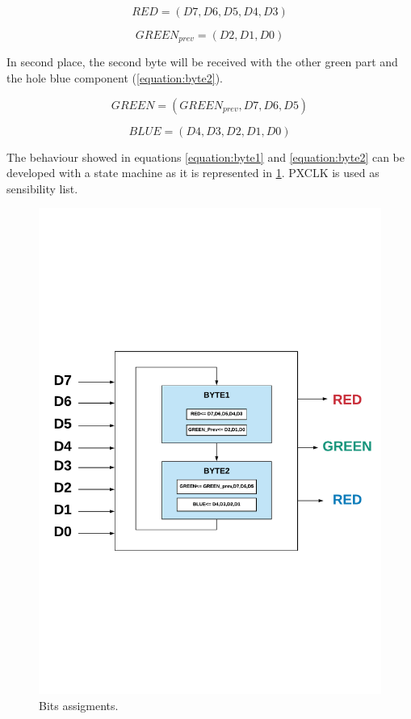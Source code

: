 	\begin{equation} \label{equation:byte1}
		RED = (D7,D6,D5,D4,D3)
	\end{equation}
	
	\begin{equation*}
		GREEN_{prev} = (D2,D1,D0)
	\end{equation*}
	
	In second place, the second byte will be received with the other green part and the hole blue component (\ref{equation:byte2}).
	
	\begin{equation} \label{equation:byte2}
	GREEN = (GREEN_{prev},D7,D6,D5)
	\end{equation}
	
	\begin{equation*}
	BLUE = (D4,D3,D2,D1,D0)
	\end{equation*}
	
	The behaviour showed in equations \ref{equation:byte1} and \ref{equation:byte2} can be developed with a state machine as it is represented in \ref{fig:assign_pixel}. PXCLK is used as sensibility list.
	
		\begin{figure}[H]
		\center
		\includegraphics[trim = 0mm 6cm 0mm 6cm, clip,scale=0.5]{imagenes/Cuadricoptero_vision/assign_pixel.pdf}
		\caption{Bits assigments.}
		\label{fig:assign_pixel}
	\end{figure}

